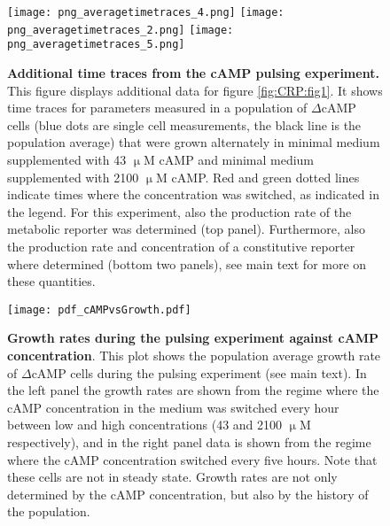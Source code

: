 
\begin{figure}%
	\centering
	\texttt{[image: png\_averagetimetraces\_4.png]} 
	\texttt{[image: png\_averagetimetraces\_2.png]}
	\texttt{[image: png\_averagetimetraces\_5.png]}
%
%
\caption{   
	\textbf{Additional time traces from the cAMP pulsing experiment.} 
	This figure displays additional data for figure \ref{fig:CRP:fig1}. 
	It shows time traces for parameters measured in a population of $\Delta$cAMP cells (blue dots are single cell measurements, the black line is the population average) that were grown alternately in minimal medium supplemented with 43 $\upmu$M cAMP and minimal medium supplemented with 2100 $\upmu$M cAMP.
	Red and green dotted lines indicate times where the concentration was switched, as indicated in the legend.
	For this experiment, also the production rate of the metabolic reporter was determined (top panel).	
	Furthermore, also the production rate and concentration of a constitutive reporter where determined (bottom two panels), see main text for more on these quantities.	
   	\label{fig:CRP:fig1sup}
}
\end{figure}%


\begin{figure}%
    \centering
    \texttt{[image: pdf\_cAMPvsGrowth.pdf]}
    \caption{ 
        \textbf{Growth rates during the pulsing experiment against cAMP concentration}. 
        This plot shows the population average growth rate of $\Delta$cAMP cells during the pulsing experiment (see main text).
        In the left panel the growth rates are shown from the regime where the cAMP concentration in the medium was switched every hour between low and high concentrations (43 and 2100 $\upmu$M respectively), 
        and in the right panel data is shown from the regime where the cAMP concentration switched every five hours.
        Note that these cells are not in steady state. 
        Growth rates are not only determined by the cAMP concentration, 
        but also by the history of the population.
    }
    \label{fig:CRP:pulsingCAMPVsMu}
\end{figure}%


